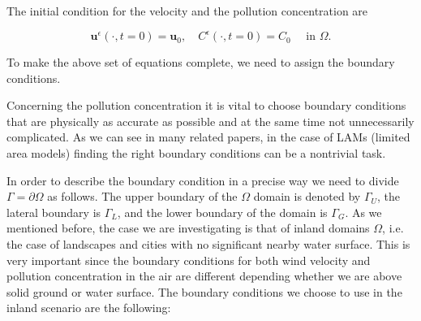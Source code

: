 \documentclass[11pt]{article}
\begin{document}

The initial condition for the velocity and the pollution concentration are
    
    \begin{equation} \label{ANSC7}
    \mathbf{u}^\epsilon (\cdot, t = 0) = \mathbf{u}_0, \quad C^\epsilon (\cdot, t=0) = C_0  \quad \text{ in } \Omega.
    \end{equation}
    
To make the above set of equations complete, we need to assign the boundary conditions.

Concerning the pollution concentration it is vital to choose boundary conditions that are physically as accurate as possible and at the same time not unnecessarily complicated. As we can see in many related papers, in the case of LAMs (limited area models) finding the right boundary conditions can be a nontrivial task.

\begin{figure}[!h]
  \centering
\end{figure}

In order to describe the boundary condition in a precise way we need to divide $\Gamma = \partial \Omega$ as follows. The upper boundary of the $\Omega$ domain is denoted by $\Gamma_U$, the lateral boundary is $\Gamma_L$, and the lower boundary of the domain is $\Gamma_G$.
As we mentioned before, the case we are investigating is that of inland domains $\Omega$, i.e. the case of landscapes and cities with no significant nearby water surface.  This is very important since the boundary conditions for both wind velocity and pollution concentration in the air are different depending whether we are above solid ground or water surface. The boundary conditions we choose to use in the inland scenario are the following:
\end{document}
